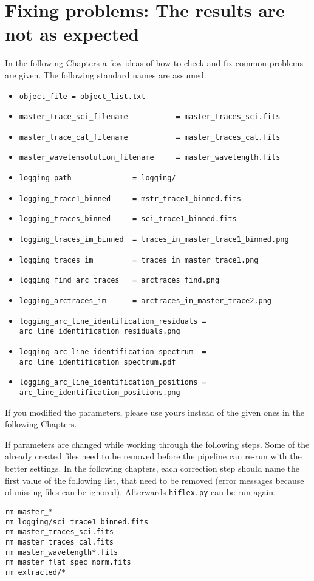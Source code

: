 \documentclass[10pt,a4paper]{article}
\begin{document}


\newpage
\section{Fixing problems: The results are not as expected}
\label{Section:Problem_solution}
In the following Chapters a few ideas of how to check and fix common problems are given. The following standard names are assumed.
\begin{itemize}\small\setlength\itemsep{-0.2cm}
  \item \verb|object_file = object_list.txt|
  \item \verb|master_trace_sci_filename           = master_traces_sci.fits|
  \item \verb|master_trace_cal_filename           = master_traces_cal.fits|
  \item \verb|master_wavelensolution_filename     = master_wavelength.fits|
  \item \verb|logging_path              = logging/|
  \item \verb|logging_trace1_binned     = mstr_trace1_binned.fits|
  \item \verb|logging_traces_binned     = sci_trace1_binned.fits|
  \item \verb|logging_traces_im_binned  = traces_in_master_trace1_binned.png|
  \item \verb|logging_traces_im         = traces_in_master_trace1.png|
  \item \verb|logging_find_arc_traces   = arctraces_find.png|
  \item \verb|logging_arctraces_im      = arctraces_in_master_trace2.png|
  \item \verb|logging_arc_line_identification_residuals = arc_line_identification_residuals.png|
  \item \verb|logging_arc_line_identification_spectrum  = arc_line_identification_spectrum.pdf|
  \item \verb|logging_arc_line_identification_positions = arc_line_identification_positions.png|
\end{itemize}
If you modified the parameters, please use yours instead of the given ones in the following Chapters.

If parameters are changed while working through the following steps. Some of the already created files need to be removed before the pipeline can re-run with the better settings. In the following chapters, each correction step should name the first value of the following list, that need to be removed (error messages because of missing files can be ignored). Afterwards \verb|hiflex.py| can be run again.
\begin{lstlisting}[style=base]
rm master_*
rm logging/sci_trace1_binned.fits
rm master_traces_sci.fits
rm master_traces_cal.fits
rm master_wavelength*.fits
rm master_flat_spec_norm.fits
rm extracted/*
\end{lstlisting}
\end{document}
